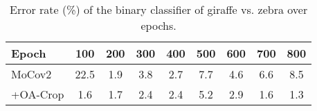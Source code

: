 \begin{table}[h]
\centering\small
\caption{
Error rate (\%) of the binary classifier of giraffe vs. zebra over epochs.
}\label{tab:multi-bias-epoch}
\begin{tabular}{l|cccccccc}
\toprule
Epoch & 100 & 200 & 300 & 400 & 500 & 600 & 700 & 800 \\
\midrule
MoCov2   & 22.5 & 1.9 & 3.8 & 2.7 & 7.7 & 4.6 & 6.6 & 8.5 \\
+OA-Crop & 1.6 & 1.7 & 2.4 & 2.4 & 5.2 & 2.9 & 1.6 & 1.3 \\
\bottomrule
\end{tabular}
\end{table}

